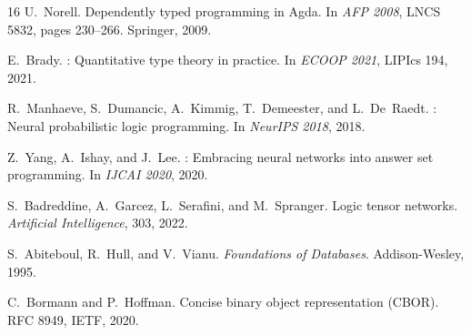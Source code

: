 \documentclass[10pt,twocolumn,letterpaper]{article}
\begin{document}
\begin{thebibliography}{16}
U.~Norell.
\newblock Dependently typed programming in {Agda}.
\newblock In \emph{AFP 2008}, LNCS 5832, pages 230--266. Springer, 2009.

E.~Brady.
: Quantitative type theory in practice.
\newblock In \emph{ECOOP 2021}, LIPIcs 194, 2021.

R.~Manhaeve, S.~Dumancic, A.~Kimmig, T.~Demeester, and L.~De~Raedt.
: Neural probabilistic logic programming.
\newblock In \emph{NeurIPS 2018}, 2018.

Z.~Yang, A.~Ishay, and J.~Lee.
: Embracing neural networks into answer set programming.
\newblock In \emph{IJCAI 2020}, 2020.

S.~Badreddine, A.~Garcez, L.~Serafini, and M.~Spranger.
\newblock Logic tensor networks.
\newblock \emph{Artificial Intelligence}, 303, 2022.

S.~Abiteboul, R.~Hull, and V.~Vianu.
\newblock \emph{Foundations of Databases}.
\newblock Addison-Wesley, 1995.

C.~Bormann and P.~Hoffman.
\newblock Concise binary object representation ({CBOR}).
\newblock RFC 8949, IETF, 2020.

\end{thebibliography}
\end{document}
